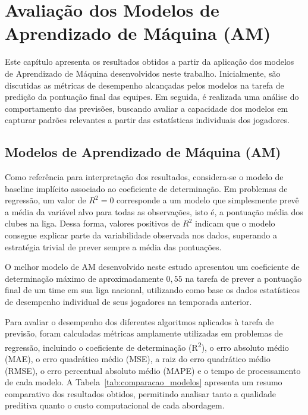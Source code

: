 \chapter{Avaliação dos Modelos de Aprendizado de Máquina (AM)}

Este capítulo apresenta os resultados obtidos a partir da aplicação dos modelos de Aprendizado de Máquina desenvolvidos neste trabalho. 
Inicialmente, são discutidas as métricas de desempenho alcançadas pelos modelos na tarefa de predição da pontuação final das equipes. 
Em seguida, é realizada uma análise do comportamento das previsões, buscando avaliar a capacidade dos modelos em capturar padrões relevantes a partir das estatísticas 
individuais dos jogadores.

\section{Modelos de Aprendizado de Máquina (AM)}

Como referência para interpretação dos resultados, considera-se o modelo de baseline implícito associado
ao coeficiente de determinação. Em problemas de regressão, um valor de $R^2 = 0$ corresponde a um modelo
que simplesmente prevê a média da variável alvo para todas as observações, isto é, a pontuação média
dos clubes na liga. Dessa forma, valores positivos de $R^2$ indicam que o modelo consegue explicar parte
da variabilidade observada nos dados, superando a estratégia trivial de prever sempre a média das pontuações.

O melhor modelo de AM desenvolvido neste estudo apresentou um coeficiente de determinação máximo de
aproximadamente $0{,}55$ na tarefa de prever a pontuação final de um time em sua liga nacional, utilizando
como base os dados estatísticos de desempenho individual de seus jogadores na temporada anterior.

Para avaliar o desempenho dos diferentes algoritmos aplicados à tarefa de previsão, foram calculadas métricas 
amplamente utilizadas em problemas de regressão, incluindo o coeficiente de determinação (R\textsuperscript{2}), 
o erro absoluto médio (MAE), o erro quadrático médio (MSE), a raiz do erro quadrático médio (RMSE), 
o erro percentual absoluto médio (MAPE) e o tempo de processamento de cada modelo. A Tabela~\ref{tab:comparacao_modelos} 
apresenta um resumo comparativo dos resultados obtidos, permitindo analisar tanto a qualidade preditiva 
quanto o custo computacional de cada abordagem.

